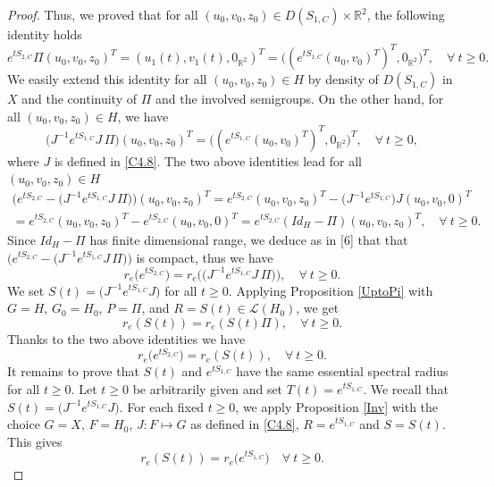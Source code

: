 \documentclass[10pt, english]{article}
\begin{document}
{\begin{proof}
Thus, we proved that for all $(u_0,v_0,z_0) \in D(S_{1,C})\times \mathbb{R}^2$, the following identity holds
\begin{equation}\label{C4.17}%
e^{tS_{2,C}}\Pi (u_0,v_0,z_0)^T=(u_1(t),v_1(t), 0_{\mathbb{R}^2})^T= \Big((e^{tS_{1,C}}(u_0,v_0)^T)^T, 0_{\mathbb{R}^2}\Big)^T, \quad \forall \ t \geqslant 0.
\end{equation}
We easily extend this identity for all $(u_0,v_0,z_0) \in H$ by density of $D(S_{1,C})$ in $X$ and the continuity of $\Pi$ and the involved semigroups.
On the other hand, for all $(u_0,v_0,z_0) \in H$, we have
\begin{equation}\label{C4.18}%
\Big(J^{-1}e^{tS_{1,C}}J\, \Pi\Big)(u_0,v_0,z_0)^T=\Big( (e^{tS_{1,C}}(u_0,v_0)^T)^T, 0_{\mathbb{R}^2}\Big)^T, \quad \forall \ t \geqslant 0,
\end{equation}
where $J$ is defined in \eqref{C4.8}.
The two above identities lead for all $(u_0,v_0,z_0) \in H$
\begin{multline}\label{C4.19}%
\Big(e^{tS_{2,C}}- \Big(J^{-1}e^{tS_{1,C}}J\, \Pi\Big)\Big)(u_0,v_0,z_0)^T=e^{tS_{2,C}}(u_0,v_0,z_0)^T - \Big(J^{-1}e^{tS_{1,C}}\Big)J(u_0,v_0,0)^T\\
=e^{tS_{2,C}}(u_0,v_0,z_0)^T - e^{tS_{2,C}}(u_0,v_0,0)^T= e^{tS_{2,C}}(Id_H-\Pi)(u_0,v_0,z_0)^T, \quad \forall \ t \geqslant 0.
\end{multline}
Since $Id_H - \Pi$ has finite dimensional range, we deduce as in [6] that that $\Big(e^{tS_{2,C}}- \Big(J^{-1}e^{tS_{1,C}}J\, \Pi\Big)\Big)$ is compact, thus we have
\begin{equation}\label{C4.20}%
r_e\Big( e^{tS_{2,C}}\Big)= r_e\Big( \Big(J^{-1}e^{tS_{1,C}}J\, \Pi\Big)\Big), \quad \forall \ t \geqslant 0.
\end{equation}
We set $S(t)=\Big(J^{-1}e^{tS_{1,C}}J\Big)$ for all $t \geqslant 0$. Applying Proposition \ref{UptoPi} with $G=H$, $G_0=H_0$, $P=\Pi$, and $R=S(t) \in \mathcal{L}(H_0)$, we get 
\begin{equation}\label{C4.21}%
r_e(S(t))= r_e(S(t)\Pi), \quad \forall \ t \geqslant 0.
\end{equation}
Thanks to the two above identities we have
\begin{equation}\label{C4.22}%
r_e\Big( e^{tS_{2,C}}\Big)=r_e(S(t)), \quad \forall \ t \geqslant 0.
\end{equation}
It remains to prove that $S(t)$ and $e^{tS_{1,C}}$ have the same essential spectral radius for all $t \geqslant 0$. Let $t \geqslant 0$ be arbitrarily given and set $T(t)=e^{tS_{1,C}}$. We recall that $S(t)=\Big(J^{-1}e^{tS_{1,C}}J\Big)$. For each fixed $t\geqslant 0$, we apply Proposition \ref{Inv} with the choice $G=X$, $F=H_0$, $J : F \mapsto G$ as defined in \eqref{C4.8}, $R=e^{tS_{1,C}}$ and $S=S(t)$. This gives
\begin{equation}\label{C4.31}%
r_e(S(t))= r_e\Big(e^{tS_{1,C}}\Big) \quad \forall \ t \geqslant 0.
\end{equation}


\end{proof}}
\end{document}
